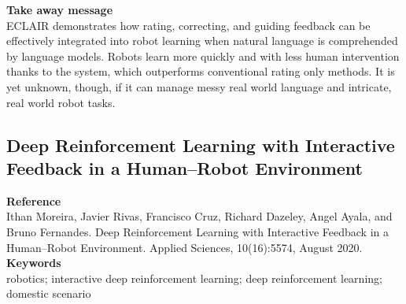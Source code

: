 \documentclass[report.tex]{subfiles}
\begin{document}
\noindent\textbf{Take away message}  \\
ECLAIR demonstrates how rating, correcting, and guiding feedback can be effectively integrated into robot learning when natural language is comprehended by language models. Robots learn more quickly and with less human intervention thanks to the system, which outperforms conventional rating only methods. It is yet unknown, though, if it can manage messy real world language and intricate, real world robot tasks.
















\subsection{Deep Reinforcement Learning with Interactive
Feedback in a Human–Robot Environment} 

\noindent\textbf{Reference} \\
\cite{moreira_deep_2020}Ithan Moreira, Javier Rivas, Francisco Cruz, Richard Dazeley, Angel Ayala, and Bruno Fernandes.
Deep Reinforcement Learning with Interactive Feedback in a Human–Robot Environment. Applied
Sciences, 10(16):5574, August 2020.\\


\noindent\textbf{Keywords} \\
robotics; interactive deep reinforcement learning; deep reinforcement learning;
domestic scenario
   \\
\end{document}

